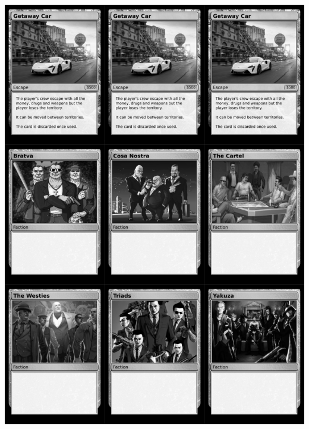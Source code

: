 \documentclass[a4paper]{article}
\begin{document}
\newpage

\begin{center}
	\centering
	\includegraphics[width=200.5mm,height=280.7mm]{output/temp/page34.png}
\end{center}
\end{document}
